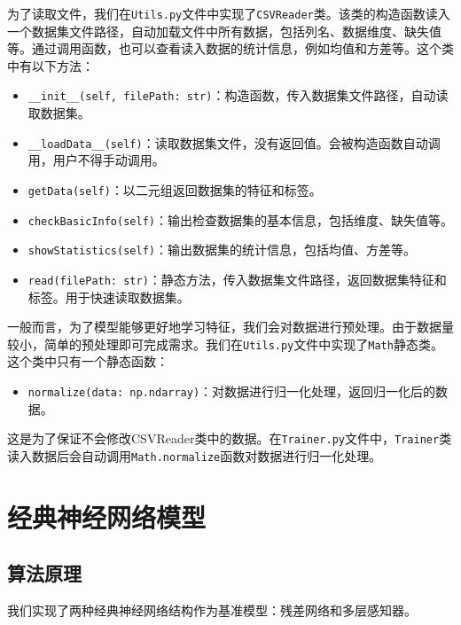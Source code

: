 \documentclass[10pt,a4paper,twoside]{article}
\numberwithin{figure}{section}%
\numberwithin{table}{section}%
\begin{document}
为了读取文件，我们在\texttt{Utils.py}文件中实现了\texttt{CSVReader}类。该类的构造函数读入一个数据集文件路径，自动加载文件中所有数据，包括列名、数据维度、缺失值等。通过调用函数，也可以查看读入数据的统计信息，例如均值和方差等。这个类中有以下方法：

\begin{itemize}
	\item \texttt{\_\_init\_\_(self, filePath: str)}：构造函数，传入数据集文件路径，自动读取数据集。
	\item \texttt{\_\_loadData\_\_(self)}：读取数据集文件，没有返回值。会被构造函数自动调用，用户不得手动调用。
	\item \texttt{getData(self)}：以二元组返回数据集的特征和标签。
	\item \texttt{checkBasicInfo(self)}：输出检查数据集的基本信息，包括维度、缺失值等。
	\item \texttt{showStatistics(self)}：输出数据集的统计信息，包括均值、方差等。
	\item \texttt{read(filePath: str)}：静态方法，传入数据集文件路径，返回数据集特征和标签。用于快速读取数据集。
\end{itemize}

一般而言，为了模型能够更好地学习特征，我们会对数据进行预处理。由于数据量较小，简单的预处理即可完成需求。我们在\texttt{Utils.py}文件中实现了\texttt{Math}静态类。这个类中只有一个静态函数：

\begin{itemize}
	\item \texttt{normalize(data: np.ndarray)}：对数据进行归一化处理，返回归一化后的数据。
\end{itemize}

这是为了保证不会修改CSVReader类中的数据。在\texttt{Trainer.py}文件中，\texttt{Trainer}类读入数据后会自动调用\texttt{Math.normalize}函数对数据进行归一化处理。


\section{经典神经网络模型}

\subsection{算法原理}

我们实现了两种经典神经网络结构作为基准模型：残差网络和多层感知器。
\end{document}
